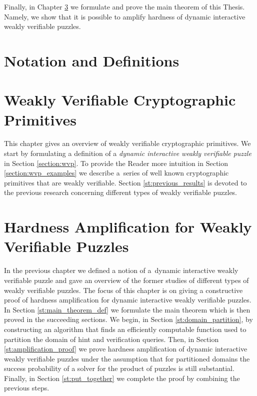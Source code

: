 \documentclass[11pt,a4paper,titlepage]{memoir}
\begin{document}
Finally, in Chapter \ref{ch:main_result} we formulate and prove the main theorem of this Thesis.
Namely, we show that it is possible to amplify hardness of dynamic interactive weakly verifiable puzzles.
%
\chapter{Notation and Definitions}
\label{ch:preliminaries}


\chapter{Weakly Verifiable Cryptographic Primitives}
\label{ch:intro_weakly}
This chapter gives an overview of weakly verifiable cryptographic primitives.
We start by formulating a definition of a \textit{dynamic interactive weakly verifiable puzzle} in Section \ref{section:wvp}.
To provide the Reader more intuition in Section \ref{section:wvp_examples} we describe a~series of well known cryptographic primitives
that are weakly verifiable. Section \ref{st:previous_results} is devoted to the previous research concerning different types of weakly verifiable puzzles.
%



%
%
\chapter{Hardness Amplification for Weakly Verifiable Puzzles}
\label{ch:main_result}
In the previous chapter we defined a notion of a~dynamic interactive weakly verifiable puzzle
and gave an overview of the former studies of different types of weakly verifiable puzzles.
The focus of this chapter is on giving a constructive proof of hardness amplification for dynamic interactive weakly verifiable puzzles.
In Section \ref{st:main_theorem_def} we formulate the main theorem which is then proved in the succeeding sections.
We begin, in Section \ref{st:domain_partition}, by constructing an algorithm that finds an efficiently computable function used
to partition the domain of hint and verification queries. Then, in Section \ref{st:amplification_proof} we prove
hardness amplification of dynamic interactive weakly verifiable puzzles under the assumption that for partitioned domains
the success probability of a solver for the product of puzzles is still substantial.
Finally, in Section \ref{st:put_together} we complete the proof by combining the previous steps.
%

%

%

%

%
\end{document}
